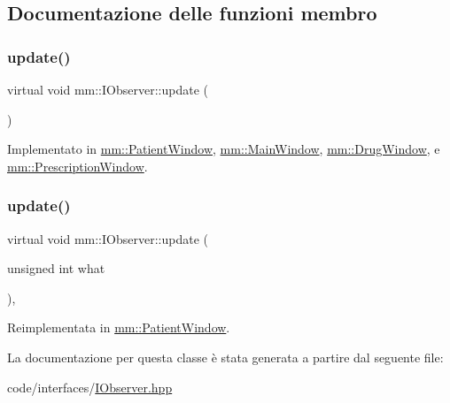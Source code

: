 \subsection{Documentazione delle funzioni membro}
\mbox{\label{classmm_1_1_i_observer_a6422af04f8e9f3ba9d6d412a3bcdd03e}} 
\subsubsection{\texorpdfstring{update()}{update()}\hspace{0.1cm}{\footnotesize\ttfamily [1/2]}}
{\footnotesize\ttfamily virtual void mm\+::\+I\+Observer\+::update (\begin{DoxyParamCaption}{ }\end{DoxyParamCaption})\hspace{0.3cm}{\ttfamily [pure virtual]}}



Implementato in \mbox{\hyperlink{classmm_1_1_patient_window_a461de186f72a8902a9f95a622dc1c02b}{mm\+::\+Patient\+Window}}, \mbox{\hyperlink{classmm_1_1_main_window_ac0fc4875dc774c1b7b1ca59d174a7fc1}{mm\+::\+Main\+Window}}, \mbox{\hyperlink{classmm_1_1_drug_window_a98c6d97f491cb648dede0ef3db2b13b2}{mm\+::\+Drug\+Window}}, e \mbox{\hyperlink{classmm_1_1_prescription_window_a51195815f64b79179e3dafbb89b785e8}{mm\+::\+Prescription\+Window}}.

\mbox{\label{classmm_1_1_i_observer_add1245a281c47575cc0e42449635a9fd}} 
\subsubsection{\texorpdfstring{update()}{update()}\hspace{0.1cm}{\footnotesize\ttfamily [2/2]}}
{\footnotesize\ttfamily virtual void mm\+::\+I\+Observer\+::update (\begin{DoxyParamCaption}\item[{unsigned int}]{what }\end{DoxyParamCaption})\hspace{0.3cm}{\ttfamily [inline]}, {\ttfamily [virtual]}}



Reimplementata in \mbox{\hyperlink{classmm_1_1_patient_window_a315f5e823a0261db4fb88b4e31333d53}{mm\+::\+Patient\+Window}}.



La documentazione per questa classe è stata generata a partire dal seguente file\+:\begin{DoxyCompactItemize}
\item 
code/interfaces/\mbox{\hyperlink{_i_observer_8hpp}{I\+Observer.\+hpp}}\end{DoxyCompactItemize}
